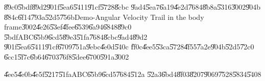 \clearpage%

\begin{case}
\U{89c0}\U{5bdf}\U{89d2}\U{901f}\U{5ea6}\U{5411}\U{91cf}\U{5728}\U{8cbc}%
\U{9ad4}\U{5ea7}\U{6a19}\U{4e2d}\U{7684}\U{8b8a}\U{5316}\U{3002}\U{904b}%
\U{884c}\U{6f14}\U{793a}\U{52d5}\U{756b}Demo-Angular Velocity Trail in the
body frame\U{3002}\U{4e26}\U{53ef}\U{4fee}\U{6539}\U{6a94}\U{6848}\U{89c0}%
\U{5bdf}ABC\U{65b9}\U{6cd5}\U{89e3}\U{51fa}\U{7684}\U{8cbc}\U{9ad4}\U{89d2}%
\U{901f}\U{5ea6}\U{5411}\U{91cf}\U{6709}\U{751a}\U{9ebc}\U{4e0d}\U{540c}%
\U{ff0c}\U{4ee5}\U{53ca}\U{5728}\U{4f55}\U{7a2e}\U{904b}\U{52d5}\U{72c0}%
\U{6cc1}\U{5f7c}\U{6b64}\U{6703}\U{76f8}\U{5dee}\U{6700}\U{591a}\U{3002}
\end{case}

\begin{case}
\U{4ee5}\U{4e0b}\U{4e5f}\U{5217}\U{51fa}ABC\U{65b9}\U{6cd5}\U{7684}\U{512a}%
\U{52a3}\U{6bd4}\U{8f03}\U{8207}\U{9069}\U{7528}\U{5834}\U{5408}
\end{case}

%
\begin{center}

\end{center}%

%
